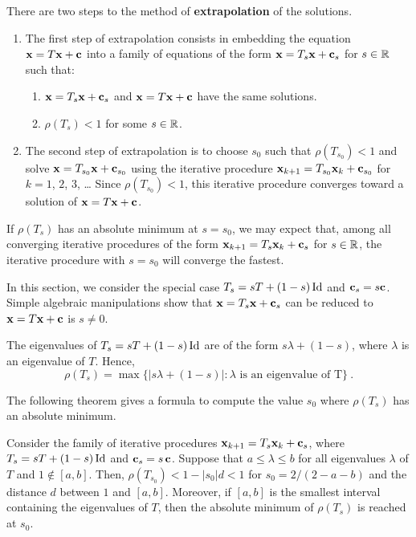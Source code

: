 There are two steps to the method of
{\bfseries extrapolation} of the solutions.

\begin{enumerate}
\item The first step of extrapolation consists in embedding the
equation
$\mathbf{x} = T\mathbf{x} + \mathbf{c}$ into a family of equations of the form
$\mathbf{x} = T_s \mathbf{x} + \mathbf{c}_s$ for $s\in \mathbb{R}$ such that: 
\begin{enumerate}
\item $\mathbf{x} = T_s \mathbf{x} + \mathbf{c}_s$ and
$\mathbf{x} = T\mathbf{x} + \mathbf{c}$ have the same solutions.
\item $\rho(T_s)<1$ for some $s\in \mathbb{R}$.
\end{enumerate}
\item The second step of extrapolation is to choose $s_0$ such
that $\rho(T_{s_0})<1$ and solve
$\mathbf{x} = T_{s_0} \mathbf{x} + \mathbf{c}_{s_0}$ using the
iterative procedure
$\mathbf{x}_{k+1} = T_{s_0} \mathbf{x}_{k} + \mathbf{c}_{s_0}$
for $k=1$, $2$, $3$, \ldots
Since $\rho(T_{s_0})<1$, this iterative procedure
converges toward a solution of $\mathbf{x} = T\mathbf{x} + \mathbf{c}$.
\end{enumerate}

If $\rho(T_s)$ has an absolute minimum at $s = s_0$, we may expect
that, among all converging iterative procedures of the form
$\displaystyle \mathbf{x}_{k+1} = T_s \mathbf{x}_{k} + \mathbf{c}_s$
for $s\in \mathbb{R}$, the iterative procedure with $s=s_0$ will converge the
fastest.

In this section, we consider the special case $T_s = sT + (1-s)\operatorname{Id}$
and $\mathbf{c}_s = s\mathbf{c}$.  Simple algebraic manipulations show that
$\mathbf{x} = T_s\mathbf{x} + \mathbf{c}_s$ can be reduced to
$\mathbf{x} = T\mathbf{x} + \mathbf{c}$ is $s\neq 0$.

The eigenvalues of $T_s = sT + (1-s)\operatorname{Id}$ are of the form
$s\lambda + (1-s)$, where $\lambda$ is an eigenvalue of $T$.  Hence,
\[
\rho(T_s) = \max\{ |s\lambda + (1-s)| : \lambda
\text{ is an eigenvalue of T}\} \ .
\]

The following theorem gives a formula to compute the value $s_0$ where
$\rho(T_s)$ has an absolute minimum.

\begin{theorem}
Consider the family of iterative procedures
$\mathbf{x}_{k+1} = T_s \mathbf{x}_{k} + \mathbf{c}_s$, where
$T_s = sT + (1-s)\operatorname{Id}$ and $\mathbf{c}_s = s\,\mathbf{c}$.  Suppose that
$a\leq \lambda \leq b$ for all eigenvalues $\lambda$ of $T$ and
$1 \not\in [a,b]$.  Then,
$\rho(T_{s_0}) < 1 - |s_0|d < 1$
for $s_0 = 2/(2-a-b)$ and the distance $d$ between $1$ and $[a,b]$.
Moreover, if $[a,b]$ is the smallest interval containing the
eigenvalues of $T$, then the absolute minimum of $\rho(T_s)$ is
reached at $s_0$.
\end{theorem}

